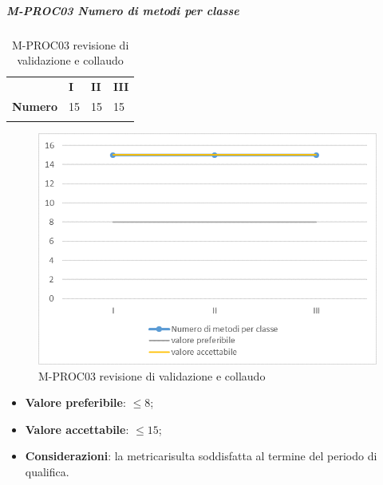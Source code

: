 \subparagraph{M-PROC03 Numero di metodi per classe} \mbox{}
\begin{longtable}[H!] {						
		>{}p{50mm}  		
		>{}p{8mm}
		>{}p{8mm}		
		>{}p{8mm}		
	}
	\rowcolor{gray!50}
	\textbf{} & \textbf{I} & \textbf{II} & \textbf{III} \TBstrut \\ [2mm]
	\textbf{Numero} & 15 & 15 & 15 \TBstrut \\ [2mm]
	\rowcolor{white}
	\caption{M-PROC03 revisione di validazione e collaudo}
\end{longtable}
\begin{figure}[H] 	
	\includegraphics[width=\linewidth]{./img/grafici/RA3.png}	
	\caption{M-PROC03 revisione di validazione e collaudo}	
\end{figure}
\begin{itemize}
	\item \textbf{Valore preferibile}: $\le 8$;
	\item \textbf{Valore accettabile}: $\le 15$;
	\item \textbf{Considerazioni}: la metrica\glosp risulta soddisfatta al termine del periodo di qualifica.
\end{itemize}

